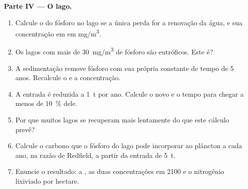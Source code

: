 \begin{problem}
\medskip
\noindent\textbf{Parte IV --- O lago.}
\begin{enumerate}[resume]
  \item Calcule o  do fósforo no lago se a única
        perda for a renovação da água, e sua concentração em  em \unit{mg/m^3}.
  \item Os lagos com mais de \qty{30}{mg/m^3} de fósforo são
        eutróficos. Este é?
  \item A sedimentação remove fósforo com sua própria constante de tempo
        de 5 anos. Recalcule o  e a
        concentração.
  \item A entrada é reduzida a \qty{1}{t} por ano. Calcule o novo
         e o tempo para chegar a menos de \qty{10}{\%} dele.
  \item Por que muitos lagos se recuperam mais lentamente do que este
        cálculo prevê?
  \item Calcule o carbono que o fósforo do lago pode incorporar ao
        plâncton a cada ano, na razão de Redfield, a partir da entrada de
        \qty{5}{t}.
  \item Enuncie o resultado: a , as duas
        concentrações em 2100 e o nitrogênio lixiviado por
        hectare.
\end{enumerate}
\end{problem}
